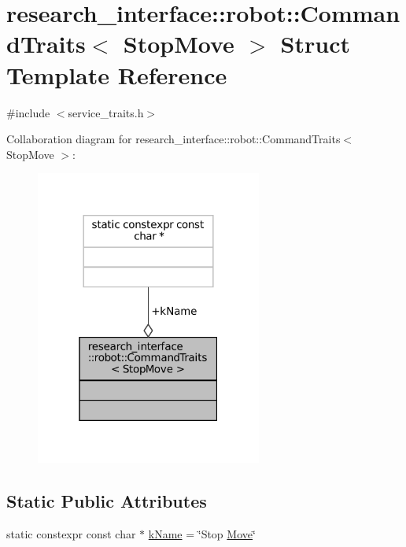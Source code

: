 \hypertarget{structresearch__interface_1_1robot_1_1CommandTraits_3_01StopMove_01_4}{}\section{research\+\_\+interface\+:\+:robot\+:\+:Command\+Traits$<$ Stop\+Move $>$ Struct Template Reference}
\label{structresearch__interface_1_1robot_1_1CommandTraits_3_01StopMove_01_4}


{\ttfamily \#include $<$service\+\_\+traits.\+h$>$}



Collaboration diagram for research\+\_\+interface\+:\+:robot\+:\+:Command\+Traits$<$ Stop\+Move $>$\+:
\nopagebreak
\begin{figure}[H]
\begin{center}
\leavevmode
\includegraphics[width=211pt]{structresearch__interface_1_1robot_1_1CommandTraits_3_01StopMove_01_4__coll__graph}
\end{center}
\end{figure}
\subsection*{Static Public Attributes}
\begin{DoxyCompactItemize}
\item 
static constexpr const char $\ast$ \hyperlink{structresearch__interface_1_1robot_1_1CommandTraits_3_01StopMove_01_4_af5cd5ed7a2c39f9ed78fcf4e05e11667}{k\+Name} = \char`\"{}Stop \hyperlink{structresearch__interface_1_1robot_1_1Move}{Move}\char`\"{}
\end{DoxyCompactItemize}


